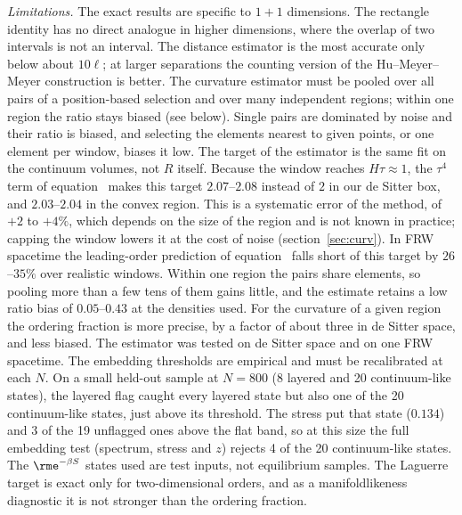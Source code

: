 \documentclass[12pt]{iopart}
\begin{document}
\emph{Limitations.} The exact results are specific to $1+1$ dimensions. The rectangle identity has no direct analogue in higher dimensions, where the overlap of two intervals is not an interval. The distance estimator is the most accurate only below about $10\ell$; at larger separations the counting version of the Hu--Meyer--Meyer construction is better. The curvature estimator must be pooled over all pairs of a position-based selection and over many independent regions; within one region the ratio stays biased (see below). Single pairs are dominated by noise and their ratio is biased, and selecting the elements nearest to given points, or one element per window, biases it low. The target of the estimator is the same fit on the continuum volumes, not $R$ itself. Because the window reaches $H\tau\approx1$, the $\tau^4$ term of equation~ makes this target $2.07$--$2.08$ instead of $2$ in our de Sitter box, and $2.03$--$2.04$ in the convex region. This is a systematic error of the method, of $+2$ to $+4\%$, which depends on the size of the region and is not known in practice; capping the window lowers it at the cost of noise (section~\ref{sec:curv}). In FRW spacetime the leading-order prediction of equation~ falls short of this target by $26$--$35\%$ over realistic windows. Within one region the pairs share elements, so pooling more than a few tens of them gains little, and the estimate retains a low ratio bias of $0.05$--$0.43$ at the densities used. For the curvature of a given region the ordering fraction is more precise, by a factor of about three in de Sitter space, and less biased. The estimator was tested on de Sitter space and on one FRW spacetime. The embedding thresholds are empirical and must be recalibrated at each $N$. On a small held-out sample at $N=800$ (8 layered and 20 continuum-like states), the layered flag caught every layered state but also one of the 20 continuum-like states, just above its threshold. The stress put that state ($0.134$) and 3 of the 19 unflagged ones above the flat band, so at this size the full embedding test (spectrum, stress and $z$) rejects 4 of the 20 continuum-like states. The $\rme^{-\beta S}$ states used are test inputs, not equilibrium samples. The Laguerre target is exact only for two-dimensional orders, and as a manifoldlikeness diagnostic it is not stronger than the ordering fraction.
\end{document}
